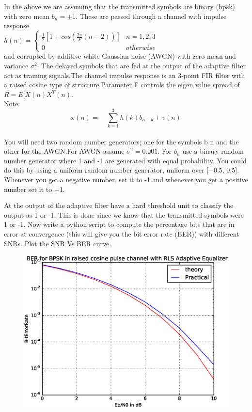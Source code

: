 \documentclass[journal,12pt,twocolumn]{IEEEtran}
\begin{document}
\bigskip
In the above we are assuming that the transmitted symbols are binary (bpsk) with zero mean $b_n=\pm 1$. These are passed through a channel with impulse response\\
\medskip
$h(n)=\begin{cases}
\frac{1}{2}[1+cos(\frac{2\pi}{F}{(n-2)})]& n=1,2,3\\
0 & otherwise
\end{cases}$\\
\medskip
and corrupted by additive white Gaussian noise (AWGN) with zero mean and variance $\sigma^2$. The delayed symbols that are fed at the output of the adaptive filter act as training signals.The channel impulse response is an 3-point FIR filter with a raised cosine type of structure.Parameter F controls the eigen value spread of $R=E[X(n)X^T(n)$.\\
\medskip
Note:\\ 
$$x(n)=\quad\sum_{k=1}^{3}h(k)b_{n-k}+v(n)$$\\
\medskip
You will need two random number generators; one for the symbols b n and the other for the AWGN.For AWGN assume $\sigma^2=0.001.$ For $b_n$ use a binary random number generator where 1 and -1 are generated with equal probability. You could do this by using a uniform random number generator, uniform over [−0.5, 0.5]. Whenever you get a negative number, set it to -1 and whenever you get a positive number set it to +1.
\medskip
\begin{problem}
At the output of the adaptive filter have a hard threshold unit to classify the output as 1 or -1. This is done since we know that the transmitted symbols were 1 or -1. Now write a python script to compute the percentage bits that are in error at convergence (this will give you the bit error rate (BER)) with different SNRs. Plot the SNR Vs BER curve.
\end{problem}
\solution
	  
\begin{center}
\begin{figure}
\centering
\includegraphics[width=\columnwidth]{SNR_Vs_BER.eps}
\caption{}
\label{fig:f3}
\end{figure}
\end{center}
\end{document}
